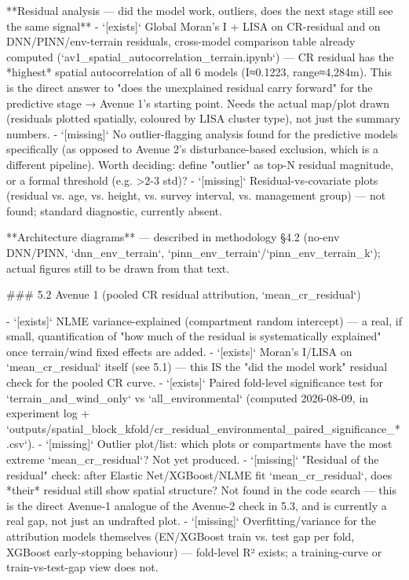 **Residual analysis — did the model work, outliers, does the next stage still see the same signal**
- `[exists]` Global Moran's I + LISA on CR-residual and on DNN/PINN/env-terrain residuals, cross-model comparison table already computed (`av1_spatial_autocorrelation_terrain.ipynb`) — CR residual has the *highest* spatial autocorrelation of all 6 models (I≈0.1223, range≈4,284m). This is the direct answer to "does the unexplained residual carry forward" for the predictive stage → Avenue 1's starting point. Needs the actual map/plot drawn (residuals plotted spatially, coloured by LISA cluster type), not just the summary numbers.
- `[missing]` No outlier-flagging analysis found for the predictive models specifically (as opposed to Avenue 2's disturbance-based exclusion, which is a different pipeline). Worth deciding: define "outlier" as top-N residual magnitude, or a formal threshold (e.g. >2-3 std)?
- `[missing]` Residual-vs-covariate plots (residual vs. age, vs. height, vs. survey interval, vs. management group) — not found; standard diagnostic, currently absent.

**Architecture diagrams** — described in methodology §4.2 (no-env DNN/PINN, `dnn_env_terrain`, `pinn_env_terrain`/`pinn_env_terrain_k`); actual figures still to be drawn from that text.

### 5.2 Avenue 1 (pooled CR residual attribution, `mean_cr_residual`)

- `[exists]` NLME variance-explained (compartment random intercept) — a real, if small, quantification of "how much of the residual is systematically explained" once terrain/wind fixed effects are added.
- `[exists]` Moran's I/LISA on `mean_cr_residual` itself (see 5.1) — this IS the "did the model work" residual check for the pooled CR curve.
- `[exists]` Paired fold-level significance test for `terrain_and_wind_only` vs `all_environmental` (computed 2026-08-09, in experiment log + `outputs/spatial_block_kfold/cr_residual_environmental_paired_significance_*.csv`).
- `[missing]` Outlier plot/list: which plots or compartments have the most extreme `mean_cr_residual`? Not yet produced.
- `[missing]` "Residual of the residual" check: after Elastic Net/XGBoost/NLME fit `mean_cr_residual`, does *their* residual still show spatial structure? Not found in the code search — this is the direct Avenue-1 analogue of the Avenue-2 check in 5.3, and is currently a real gap, not just an undrafted plot.
- `[missing]` Overfitting/variance for the attribution models themselves (EN/XGBoost train vs. test gap per fold, XGBoost early-stopping behaviour) — fold-level R² exists; a training-curve or train-vs-test-gap view does not.

